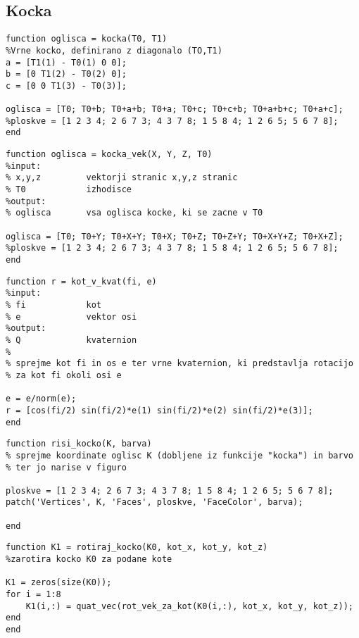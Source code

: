 \documentclass[12pt,a4paper,twoside]{article}
\theoremstyle{definition} %
\theoremstyle{plain} %
\numberwithin{equation}{section}  %
\begin{document}
\subsection{Kocka}

\begin{lstlisting}[caption = {kocka}]
function oglisca = kocka(T0, T1)
%Vrne kocko, definirano z diagonalo (TO,T1)
a = [T1(1) - T0(1) 0 0];
b = [0 T1(2) - T0(2) 0];
c = [0 0 T1(3) - T0(3)];

oglisca = [T0; T0+b; T0+a+b; T0+a; T0+c; T0+c+b; T0+a+b+c; T0+a+c];
%ploskve = [1 2 3 4; 2 6 7 3; 4 3 7 8; 1 5 8 4; 1 2 6 5; 5 6 7 8]; 
end
\end{lstlisting}

\begin{lstlisting}[caption = {kocka\_vek}]
function oglisca = kocka_vek(X, Y, Z, T0)
%input:
% x,y,z         vektorji stranic x,y,z stranic
% T0            izhodisce
%output:
% oglisca       vsa oglisca kocke, ki se zacne v T0

oglisca = [T0; T0+Y; T0+X+Y; T0+X; T0+Z; T0+Z+Y; T0+X+Y+Z; T0+X+Z];
%ploskve = [1 2 3 4; 2 6 7 3; 4 3 7 8; 1 5 8 4; 1 2 6 5; 5 6 7 8]; 
end
\end{lstlisting}

\begin{lstlisting}[caption = {kot\_v\_kvat}]
function r = kot_v_kvat(fi, e)
%input:
% fi            kot
% e             vektor osi
%output:
% Q             kvaternion
%
% sprejme kot fi in os e ter vrne kvaternion, ki predstavlja rotacijo 
% za kot fi okoli osi e

e = e/norm(e);
r = [cos(fi/2) sin(fi/2)*e(1) sin(fi/2)*e(2) sin(fi/2)*e(3)];
end
\end{lstlisting}

\begin{lstlisting}[caption = {risi\_kocko}]
function risi_kocko(K, barva)
% sprejme koordinate oglisc K (dobljene iz funkcije "kocka") in barvo
% ter jo narise v figuro

ploskve = [1 2 3 4; 2 6 7 3; 4 3 7 8; 1 5 8 4; 1 2 6 5; 5 6 7 8]; 
patch('Vertices', K, 'Faces', ploskve, 'FaceColor', barva);

end
\end{lstlisting}

\begin{lstlisting}[caption = {}]
function K1 = rotiraj_kocko(K0, kot_x, kot_y, kot_z)
%zarotira kocko K0 za podane kote

K1 = zeros(size(K0));
for i = 1:8
    K1(i,:) = quat_vec(rot_vek_za_kot(K0(i,:), kot_x, kot_y, kot_z));
end
end
\end{lstlisting}
\end{document}
